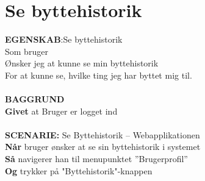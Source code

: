 \section{Se byttehistorik}
{\color{blue}\textbf{EGENSKAB}:}Se byttehistorik \\
Som bruger \\
Ønsker jeg at kunne se min byttehistorik \\
For at kunne se, hvilke ting jeg har byttet mig til.\\ \\
{\color{blue}\textbf{BAGGRUND}} \\
{\color{blue}\textbf{Givet}} at Bruger er logget ind \\
\\
{\color{blue}\textbf{SCENARIE:}} Se Byttehistorik – Webapplikationen \\
{\color{blue}\textbf{Når}} bruger ønsker at se sin byttehistorik i systemet\\
{\color{blue}\textbf{Så}} navigerer han til menupunktet ”Brugerprofil” \\
{\color{blue}\textbf{Og}} trykker på "Byttehistorik"-knappen